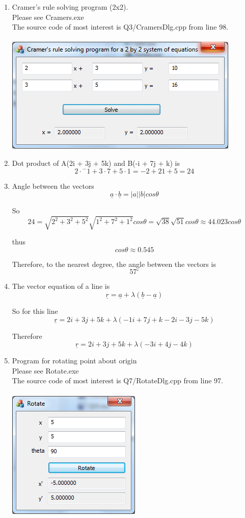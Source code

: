 \documentclass{article}
\begin{document}
\begin{enumerate}
\item Cramer's rule solving program (2x2). \\
Please see Cramers.exe \\
The source code of most interest is Q3/CramersDlg.cpp from line 98. \\
\\
\includegraphics{Cramers}
\\

\item Dot product of A(2i + 3j + 5k) and B(-i + 7j + k) is
\[
2 \cdot {^-}1 + 3 \cdot 7 + 5 \cdot 1 = -2 + 21 + 5 = 24
\]

\item Angle between the vectors
\[
\underline{a}\cdot \underline{b} = \left| a \right| \left| b \right| cos \theta
\]

So
\[
24 = \sqrt{2^2 + 3^2 + 5^2} \sqrt{1^2 + 7^2 + 1^2} cos \theta = \sqrt{38} \sqrt{51} cos \theta \approx 44.023 cos \theta
\]

thus
\[
cos \theta \approx 0.545
\]

Therefore, to the nearest degree, the angle between the vectors is \[57{^\circ} \]

\item The vector equation of a line is
\[
\underline{r} = \underline{a} + \lambda(\underline{b} - \underline{a})
\]

So for this line
\[
\underline{r} = 2i + 3j + 5k + \lambda(-1i + 7j +k - 2i - 3j - 5k)
\]

Therefore
\[
\underline{r} = 2i + 3j + 5k + \lambda(-3i + 4j - 4k)
\]

\item Program for rotating point about origin \\
Please see Rotate.exe \\
The source code of most interest is Q7/RotateDlg.cpp from line 97. \\
\\
\includegraphics{Rotate}
\\


\end{enumerate}
\end{document}

